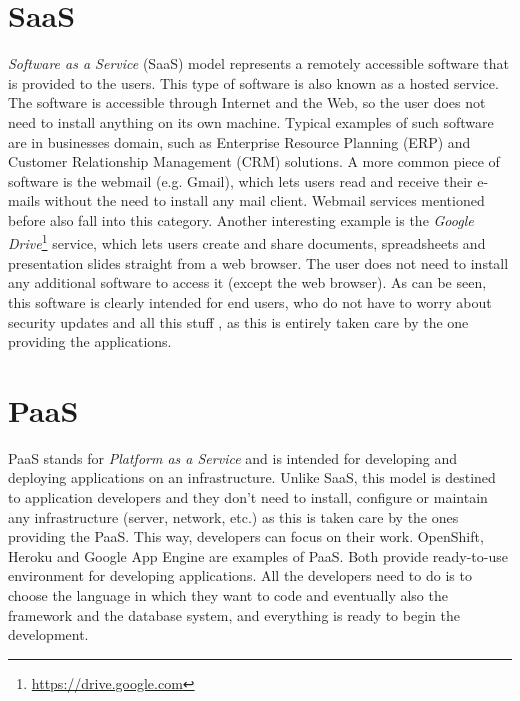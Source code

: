\section{SaaS}
\textit{Software as a Service} (SaaS) model represents a remotely accessible software that is provided to the users. 
This type of software is also known as a hosted service. 
The software is accessible through Internet and the Web, so the user does not need to install anything on its own machine. 
Typical examples of such software are in businesses domain, such as Enterprise Resource Planning (ERP) and Customer Relationship Management (CRM) solutions. 
A more common piece of software is the webmail (e.g. Gmail), which lets users read and receive their e-mails without the need to install any mail client. 
Webmail services mentioned before also fall into this category. 
Another interesting example is the \textit{Google Drive}\footnote{\url{https://drive.google.com}} service, which lets users create and share documents, spreadsheets and presentation slides straight from a web browser. 
The user does not need to install any additional software to access it (except the web browser). 
As can be seen, this software is clearly intended for end users, who do not have to worry about security updates and all this stuff , as this is entirely taken care by the one providing the applications.



\section{PaaS}
PaaS stands for \textit{Platform as a Service} and is intended for developing and deploying applications on an infrastructure. 
Unlike SaaS, this model is destined to application developers and they don't need to install, configure or maintain any infrastructure (server, network, etc.) as this is taken care by the ones providing the PaaS. 
This way, developers can focus on their work. 
OpenShift, Heroku and Google App Engine are examples of PaaS.
Both provide ready-to-use environment for developing applications.
All the developers need to do is to choose the language in which they want to code and eventually also the framework and the database system, and everything is ready to begin the development.





